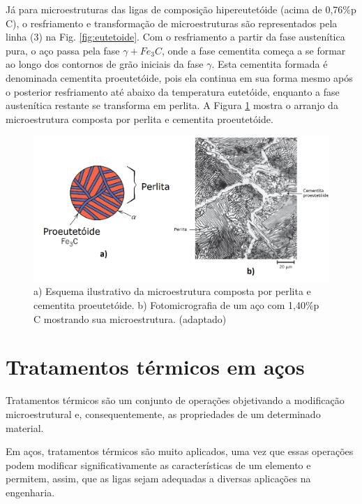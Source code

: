 \documentclass[
12pt,
openany, %
oneside, %
a4paper,			
english,			
brazil			        %
]{abntbibufjf}
\begin{document}
	Já para microestruturas das ligas de composição hipereutetóide (acima de 0,76\%p C), o resfriamento e transformação de microestruturas são representados pela linha (3) na Fig. \ref{fig:eutetoide}. Com o resfriamento a partir da fase austenítica pura, o aço passa pela fase $\gamma + Fe_3C$, onde a fase cementita começa a se formar ao longo dos contornos de grão iniciais da fase $\gamma$. Esta cementita formada é denominada cementita proeutetóide, pois ela continua em sua forma mesmo após o posterior resfriamento até abaixo da temperatura eutetóide, enquanto a fase austenítica restante se transforma em perlita. A Figura \ref{fig:perlita_hiper} mostra o arranjo da microestrutura composta por perlita e cementita proeutetóide.
	
	\begin{figure}[H]
		\centering
		\includegraphics[width=1\textwidth]{perlita_hiper}
		\caption{a) Esquema ilustrativo da microestrutura composta por perlita e cementita proeutetóide. b) Fotomicrografia de um aço com 1,40\%p C mostrando sua microestrutura. \cite{callister2011materials} (adaptado)}
		\label{fig:perlita_hiper}
	\end{figure}
	
\pagebreak
\section{Tratamentos térmicos em aços}	

	Tratamentos térmicos são um conjunto de operações objetivando a modificação microestrutural e, consequentemente, as propriedades de um determinado material. 

	Em aços, tratamentos térmicos são muito aplicados, uma vez que essas operações podem modificar significativamente as características de um elemento e permitem, assim, que as ligas sejam adequadas a diversas aplicações na engenharia.
\end{document}
